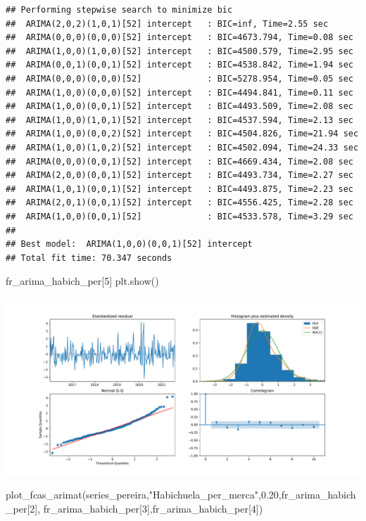 \documentclass[
]{book}
\newenvironment{Shaded}{\begin{snugshade}}{\end{snugshade}}
\newcommand{\DecValTok}[1]{\textcolor[rgb]{0.00,0.00,0.81}{#1}}
\newcommand{\FloatTok}[1]{\textcolor[rgb]{0.00,0.00,0.81}{#1}}
\newcommand{\NormalTok}[1]{#1}
\newcommand{\StringTok}[1]{\textcolor[rgb]{0.31,0.60,0.02}{#1}}
\begin{document}
\begin{verbatim}
## Performing stepwise search to minimize bic
##  ARIMA(2,0,2)(1,0,1)[52] intercept   : BIC=inf, Time=2.55 sec
##  ARIMA(0,0,0)(0,0,0)[52] intercept   : BIC=4673.794, Time=0.08 sec
##  ARIMA(1,0,0)(1,0,0)[52] intercept   : BIC=4500.579, Time=2.95 sec
##  ARIMA(0,0,1)(0,0,1)[52] intercept   : BIC=4538.842, Time=1.94 sec
##  ARIMA(0,0,0)(0,0,0)[52]             : BIC=5278.954, Time=0.05 sec
##  ARIMA(1,0,0)(0,0,0)[52] intercept   : BIC=4494.841, Time=0.11 sec
##  ARIMA(1,0,0)(0,0,1)[52] intercept   : BIC=4493.509, Time=2.08 sec
##  ARIMA(1,0,0)(1,0,1)[52] intercept   : BIC=4537.594, Time=2.13 sec
##  ARIMA(1,0,0)(0,0,2)[52] intercept   : BIC=4504.826, Time=21.94 sec
##  ARIMA(1,0,0)(1,0,2)[52] intercept   : BIC=4502.094, Time=24.33 sec
##  ARIMA(0,0,0)(0,0,1)[52] intercept   : BIC=4669.434, Time=2.08 sec
##  ARIMA(2,0,0)(0,0,1)[52] intercept   : BIC=4493.734, Time=2.27 sec
##  ARIMA(1,0,1)(0,0,1)[52] intercept   : BIC=4493.875, Time=2.23 sec
##  ARIMA(2,0,1)(0,0,1)[52] intercept   : BIC=4556.425, Time=2.28 sec
##  ARIMA(1,0,0)(0,0,1)[52]             : BIC=4533.578, Time=3.29 sec
## 
## Best model:  ARIMA(1,0,0)(0,0,1)[52] intercept
## Total fit time: 70.347 seconds
\end{verbatim}

\begin{Shaded}
\begin{Highlighting}[]
\NormalTok{fr\_arima\_habich\_per[}\DecValTok{5}\NormalTok{]}
\NormalTok{plt.show()}
\end{Highlighting}
\end{Shaded}

\includegraphics{bookdown-demo_files/figure-latex/unnamed-chunk-166-161.pdf}

\begin{Shaded}
\begin{Highlighting}[]

\NormalTok{plot\_fcas\_arimat(series\_pereira,}\StringTok{"Habichuela\_per\_merca"}\NormalTok{,}\FloatTok{0.20}\NormalTok{,fr\_arima\_habich\_per[}\DecValTok{2}\NormalTok{],}
\NormalTok{fr\_arima\_habich\_per[}\DecValTok{3}\NormalTok{],fr\_arima\_habich\_per[}\DecValTok{4}\NormalTok{])}
\end{Highlighting}
\end{Shaded}
\end{document}
